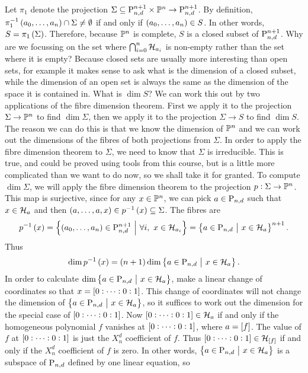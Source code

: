 \begin{example*}
\pagebreak

Let $ \pi_1 $ denote the projection $ \Sigma \subseteq \P_{n, d}^{n + 1} \times \PP^n \to \P_{n, d}^{n + 1} $. By definition, $ \pi_1^{-1}\br{a_0, \dots, a_n} \cap \Sigma \ne \emptyset $ if and only if $ \br{a_0, \dots, a_n} \in S $. In other words, $ S = \pi_1\br{\Sigma} $. Therefore, because $ \PP^n $ is complete, $ S $ is a closed subset of $ \P_{n, d}^{n + 1} $. Why are we focussing on the set where $ \bigcap_{i = 0}^n \HHH_{a_i} $ is non-empty rather than the set where it is empty? Because closed sets are usually more interesting than open sets, for example it makes sense to ask what is the dimension of a closed subset, while the dimension of an open set is always the same as the dimension of the space it is contained in. What is $ \dim S $? We can work this out by two applications of the fibre dimension theorem. First we apply it to the projection $ \Sigma \to \PP^n $ to find $ \dim \Sigma $, then we apply it to the projection $ \Sigma \to S $ to find $ \dim S $. The reason we can do this is that we know the dimension of $ \PP^n $ and we can work out the dimensions of the fibres of both projections from $ \Sigma $. In order to apply the fibre dimension theorem to $ \Sigma $, we need to know that $ \Sigma $ is irreducible. This is true, and could be proved using tools from this course, but is a little more complicated than we want to do now, so we shall take it for granted. To compute $ \dim \Sigma $, we will apply the fibre dimension theorem to the projection $ p : \Sigma \to \PP^n $. This map is surjective, since for any $ x \in \PP^n $, we can pick $ a \in \P_{n, d} $ such that $ x \in \HHH_a $ and then $ \br{a, \dots, a, x} \in p^{-1}\br{x} \subseteq \Sigma $. The fibres are
$$ p^{-1}\br{x} = \cbr{\br{a_0, \dots, a_n} \in \P_{n, d}^{n + 1} \st \forall i, \ x \in \HHH_{a_i}} = \cbr{a \in \P_{n, d} \st x \in \HHH_a}^{n + 1}. $$
Thus
$$ \dim p^{-1}\br{x} = \br{n + 1}\dim \cbr{a \in \P_{n, d} \st x \in \HHH_a}. $$
In order to calculate $ \dim \cbr{a \in \P_{n, d} \st x \in \HHH_a} $, make a linear change of coordinates so that $ x = \sbr{0 : \dots : 0 : 1} $. This change of coordinates will not change the dimension of $ \cbr{a \in \P_{n, d} \st x \in \HHH_a} $, so it suffices to work out the dimension for the special case of $ \sbr{0 : \dots : 0 : 1} $. Now $ \sbr{0 : \dots : 0 : 1} \in \HHH_a $ if and only if the homogeneous polynomial $ f $ vanishes at $ \sbr{0 : \dots : 0 : 1} $, where $ a = \sbr{f} $. The value of $ f $ at $ \sbr{0 : \dots : 0 : 1} $ is just the $ X_n^d $ coefficient of $ f $. Thus $ \sbr{0 : \dots : 0 : 1} \in \HHH_{\sbr{f}} $ if and only if the $ X_n^d $ coefficient of $ f $ is zero. In other words, $ \cbr{a \in \P_{n, d} \st x \in \HHH_a} $ is a subspace of $ \P_{n, d} $ defined by one linear equation, so

\end{example*}
